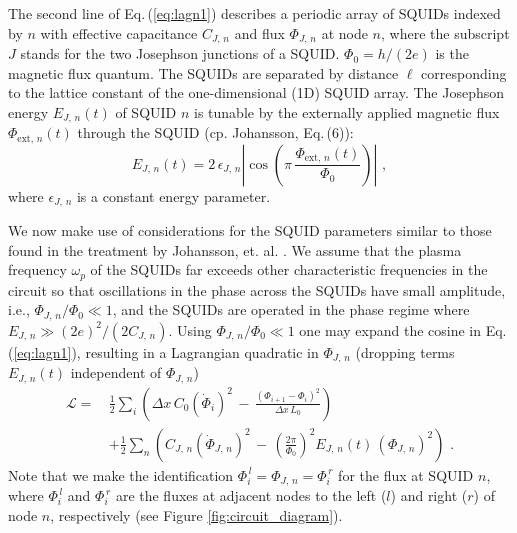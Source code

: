 %
%
\newpage
The second line of Eq.\,(\ref{eq:lagn1}) describes a periodic array of SQUIDs indexed by $n$ 
with effective capacitance $C_{J,\,n}$ and flux $\Phi_{J,\,n}$ at node $n$, where 
the subscript $J$ stands for the two Josephson junctions of a SQUID.
$\Phi_0 = h / (2 e)$ is the magnetic flux quantum.
The SQUIDs are separated by 
distance $\ell$ corresponding to the lattice constant of the one-dimensional (1D) SQUID array. 
The Josephson energy $E_{J,\,n}(t)$ of SQUID $n$ is tunable
by the externally applied magnetic flux $\Phi_{\text{ext},\,n}(t)$ through the SQUID 
(cp. Johansson, Eq.\,(6)): 
%
\begin{equation} \label{eq:squidenergy}
    E_{J,\,n}(t) = 2 \, \epsilon_{J,\,n} 
    \left\vert \cos\left(\pi \, \frac{\Phi_{\text{ext},\,n}(t)}{\Phi_0}\right)\right\vert \, \, ,
\end{equation}
%
where $\epsilon_{J,\,n}$ is a constant energy parameter.

We now make use of considerations for the SQUID parameters similar to those found in the treatment by Johansson, et. al. \cite{Johansson2010}.
We assume that the plasma frequency $\omega_p$ of the SQUIDs far exceeds other characteristic frequencies 
in the circuit so that oscillations in the phase across the SQUIDs have small amplitude, i.e., 
$\Phi_{J,\,n} / \Phi_0 \ll 1$,
and the SQUIDs are operated in the phase regime where $E_{J,\,n} \gg (2e)^2 / (2C_{J,\,n})$.
Using $\Phi_{J,\,n} / \Phi_0 \ll 1$ one may expand the cosine in Eq.\,(\ref{eq:lagn1}), 
resulting in a Lagrangian quadratic in $\Phi_{J,\,n}$ (dropping terms $E_{J,\,n}(t)$ 
independent of $\Phi_{J,\,n}$)
%
\begin{equation} \label{eq:lagn2}
\begin{split}
\mathcal{L} = \, & \frac{1}{2} \sum_i \left( \Delta x \, C_{0} \left(\dot{\Phi}_{i}\right)^{2} \, - \, 
\frac{\left(\Phi_{i+1}-\Phi_{i}\right)^{2}}{\Delta x \, L_{0}} \right)  \\[2mm]
& + \frac{1}{2} \sum_n \left( C_{J,\,n} \left(\dot{\Phi}_{J,\,n} \right)^{2} \, - \, 
 \left(\frac{2 \pi}{\Phi_0} \right)^2 E_{J,\,n}(t) \, \left( \Phi_{J,\,n} \right)^2 
\right) \, \, .
\end{split}
\end{equation}
%
Note that we make the identification $\Phi_i^{\,l} = \Phi_{J,\,n} = \Phi_i^{\,r}$ for the flux at SQUID $n$, 
where $\Phi_i^{\,l}$ and $\Phi_i^{\,r}$ are the fluxes at adjacent nodes to the left ($l$) and right ($r$) of 
node $n$, respectively (see Figure \ref{fig:circuit_diagram}). 

